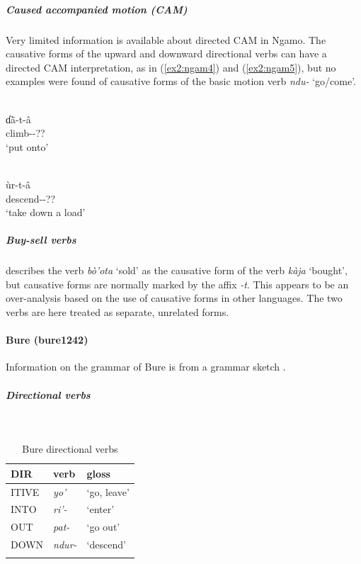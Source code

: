 \subparagraph{Caused accompanied motion (CAM)}



Very limited information is available about directed CAM in Ngamo. The causative forms of the upward and downward directional verbs can have a directed CAM interpretation, as in (\ref{ex2:ngam4}) and (\ref{ex2:ngam5}), but no examples were found of causative forms of the basic motion verb \textit{ndu-} `go/come'. 

\ea\label{ex2:ngam4}
 \\
\gll ɗā̀-t-â  \\
climb--?? \\
\glt `put onto'

\ex\label{ex2:ngam5}
 \\
\gll ùr-t-â \\
descend--?? \\
\glt `take down a load'
\z

\subparagraph{Buy-sell verbs}


\sloppy
\citet[332]{schuhChadicCornucopia2017} describes the verb \textit{bò’ota} `sold' as the caus\-a\-tive form of the verb \textit{kàja} `bought', but causative forms are normally marked by the affix \textit{-t}. This appears to be an over-analysis based on the use of causative forms in other languages. The two verbs are here treated as separate, unrelated forms.
\fussy

\paragraph*{Bure (bure1242)}

Information on the grammar of Bure is from a grammar sketch \citep{baticGrammaticalSketchBure2014}. 

\subparagraph{Directional verbs}~



\begin{table}[H]
	\caption{Bure directional verbs} 
	\label{tab:bureV}
	\begin{tabular}{lll} %
		\lsptoprule
		DIR & verb & gloss   \\ %
		\midrule
		ITIVE & \textit{yo'} & `go, leave' \\
		INTO & \textit{ri'-} & `enter' \\
		OUT & \textit{pat-} & `go out' \\
		DOWN & \textit{ndur-} & `descend' \\
		\lspbottomrule
	\end{tabular}
\end{table}

